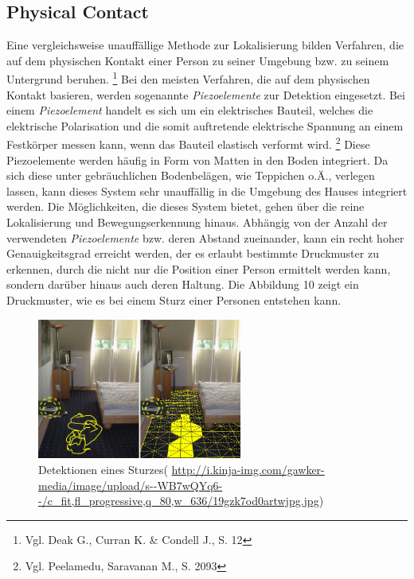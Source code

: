 \subsection{Physical Contact}
Eine vergleichsweise unauffällige Methode zur Lokalisierung bilden Verfahren, die auf dem physischen Kontakt einer Person zu seiner Umgebung bzw. zu seinem Untergrund beruhen. \footnote{Vgl. Deak G., Curran K. \& Condell J., S. 12} Bei den meisten Verfahren, die auf dem physischen Kontakt basieren, werden sogenannte \textit{Piezoelemente} zur Detektion eingesetzt. Bei einem \textit{Piezoelement} handelt es sich um ein elektrisches Bauteil, welches die elektrische Polarisation und die somit auftretende elektrische Spannung an einem Festkörper messen kann, wenn das Bauteil elastisch verformt wird. \footnote{Vgl. Peelamedu, Saravanan M., S. 2093} \newline\newline
Diese Piezoelemente werden häufig in Form von Matten in den Boden integriert. Da sich diese unter gebräuchlichen Bodenbelägen, wie Teppichen o.Ä., verlegen lassen, kann dieses System sehr unauffällig in die Umgebung des Hauses integriert werden. Die Möglichkeiten, die dieses System bietet, gehen über die reine Lokalisierung und Bewegungserkennung hinaus.
Abhängig von der Anzahl der verwendeten \textit{Piezoelemente} bzw. deren Abstand zueinander, kann ein recht hoher Genauigkeitsgrad erreicht werden, der es erlaubt bestimmte Druckmuster zu erkennen, durch die nicht nur die Position einer Person ermittelt werden kann, sondern darüber hinaus auch deren Haltung. Die Abbildung 10 zeigt ein Druckmuster, wie es bei einem Sturz einer Personen entstehen kann.\\

\begin{figure}[H]
	\centering
	\includegraphics[width=0.6\textwidth]{pictures/piezo}
	\caption{Detektionen eines Sturzes( \url{http://i.kinja-img.com/gawker-media/image/upload/s--WB7wQYq6--/c_fit,fl_progressive,q_80,w_636/19gzk7od0artwjpg.jpg})}
\end{figure} 

